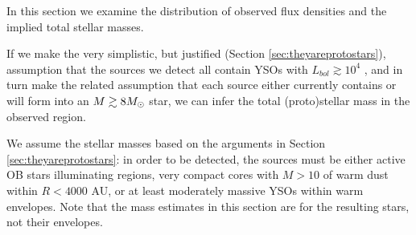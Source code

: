 \documentclass[twocolumn]{aastex61}
\begin{document}
In this section we examine the distribution of observed flux densities and the
implied total stellar masses.  


If we make the very simplistic, but justified (Section
\ref{sec:theyareprotostars}), assumption that the sources we detect all contain
YSOs with $L_{bol}\gtrsim10^4$ \lsun, and in turn make the related
assumption that each source either currently contains or will form into an
$M\gtrsim8 M_{\odot}$ star, we can infer the total (proto)stellar mass in the
observed region.


We assume the stellar masses based on the arguments in Section
\ref{sec:theyareprotostars}: in order to be detected, the sources must be either
active OB stars illuminating \hii regions, very compact cores with $M>10$
\msun of warm dust within $R<4000$ AU, or at least moderately massive YSOs
within warm envelopes.  Note that the mass estimates in this section are for
the resulting stars, not their envelopes.  

\end{document}
